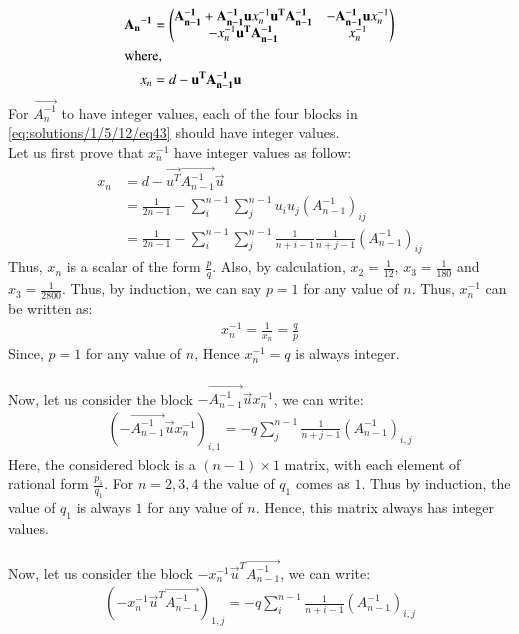 \begin{align}
    \mathbf{{A_n}^{-1}} &= \begin{pmatrix}\mathbf{A_{n-1}^{-1}}+\mathbf{A_{n-1}^{-1}}\mathbf{u}x_n^{-1}\mathbf{u^T}\mathbf{A_{n-1}^{-1}} & -\mathbf{A_{n-1}^{-1}}\mathbf{u}x_n^{-1}\\-x_n^{-1}\mathbf{u^T}\mathbf{A_{n-1}^{-1}} & x_n^{-1}\end{pmatrix}\label{eq:solutions/1/5/12/eq43}\\
\intertext{where,}
x_n &= d-\mathbf{u^T}\mathbf{A_{n-1}^{-1}}\mathbf{u}
\end{align}
For $\vec{A_{n}^{-1}}$ to have integer values, each of the four blocks in \eqref{eq:solutions/1/5/12/eq43} should have integer values.\\
Let us first prove that $x_n^{-1}$ have integer values as follow:
\begin{align}
    x_n &= d-\vec{u^T}\vec{A_{n-1}^{-1}}\vec{u}\\
    &=\frac{1}{2n-1}-\sum_i ^{n-1}\sum_j^{n-1} u_iu_j (A_{n-1}^{-1})_{ij}\\
    &=\frac{1}{2n-1}-\sum_i ^{n-1}\sum_j^{n-1} \frac{1}{n+i-1}\frac{1}{n+j-1}(A_{n-1}^{-1})_{ij}
\end{align}
Thus, $x_n$ is a scalar of the form $\frac{p}{q}$. Also, by calculation, $x_2=\frac{1}{12}$, $x_3=\frac{1}{180}$ and $x_3=\frac{1}{2800}$. Thus, by induction, we can say $p=1$ for any value of $n$. Thus, $x_n^{-1}$ can be written as:
\begin{align}
    x_n^{-1}=\frac{1}{x_n}=\frac{q}{p}
\end{align}
Since, $p=1$ for any value of $n$, Hence $x_n^{-1}=q$ is always integer.\\ \\
Now, let us consider the block $-\vec{A_{n-1}^{-1}}\vec{u}x_n^{-1}$, we can write:
\begin{align}
   (-\vec{A_{n-1}^{-1}}\vec{u}x_n^{-1})_{i,1}= -q\sum_j ^{n-1}\frac{1}{n+j-1}(A_{n-1}^{-1})_{i,j}
\end{align}
Here, the considered block is a $(n-1) \times 1$ matrix, with each element of rational form $\frac{p_1}{q_1}$. For $n=2,3,4$ the value of $q_1$ comes as $1$. Thus by induction, the value of $q_1$ is always $1$ for any value of $n$. Hence, this matrix always has integer values. \\\\
Now, let us consider the block $-x_n^{-1}\vec{u}^T\vec{A_{n-1}^{-1}}$, we can write:
\begin{align}
   (-x_n^{-1}\vec{u}^T\vec{A_{n-1}^{-1}})_{1,j}= -q\sum_i ^{n-1}\frac{1}{n+i-1}(A_{n-1}^{-1})_{i,j}
\end{align}
